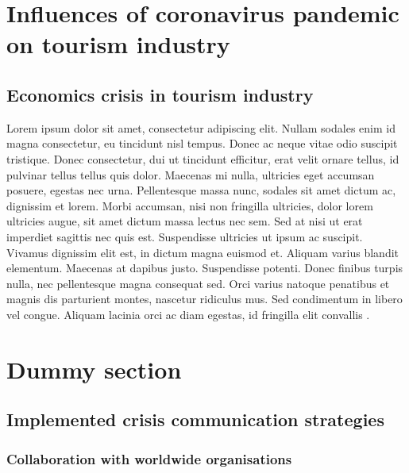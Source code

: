 \documentclass[draft=false
              ,paper=a4
              ,twoside=false
              ,fontsize=12pt
              ,headsepline
              ,BCOR10mm
              ,DIV11
              ]{article}
\begin{document}
\vspace{12pt}
\section{Influences of coronavirus pandemic on tourism industry}
\vspace{6pt}
\subsection{Economics crisis in tourism industry}
\vspace{6pt}

Lorem ipsum dolor sit amet, consectetur adipiscing elit. Nullam sodales enim id magna consectetur, eu tincidunt nisl tempus. Donec ac neque vitae odio suscipit tristique. Donec consectetur, dui ut tincidunt efficitur, erat velit ornare tellus, id pulvinar tellus tellus quis dolor. Maecenas mi nulla, ultricies eget accumsan posuere, egestas nec urna. Pellentesque massa nunc, sodales sit amet dictum ac, dignissim et lorem. Morbi accumsan, nisi non fringilla ultricies, dolor lorem ultricies augue, sit amet dictum massa lectus nec sem. Sed at nisi ut erat imperdiet sagittis nec quis est. Suspendisse ultricies ut ipsum ac suscipit. Vivamus dignissim elit est, in dictum magna euismod et. Aliquam varius blandit elementum. Maecenas at dapibus justo. Suspendisse potenti. Donec finibus turpis nulla, nec pellentesque magna consequat sed. Orci varius natoque penatibus et magnis dis parturient montes, nascetur ridiculus mus. Sed condimentum in libero vel congue. Aliquam lacinia orci ac diam egestas, id fringilla elit convallis \cite{lorem}.

\vspace{12pt}
\section{Dummy section}
\vspace{6pt}
\subsection{Implemented crisis communication strategies}
\vspace{6pt}
\subsubsection{Collaboration with worldwide organisations}
\vspace{6pt}

\vspace{12pt}
\end{document}
